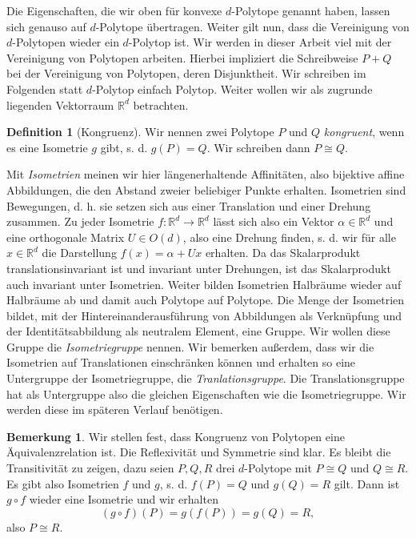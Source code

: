 \documentclass[11pt,titlepage]{article}
\newcommand{\setR}{\mathbb{R}}
\theoremstyle{definition}
\newtheorem{definition}[theorem]{Definition}
\newtheorem{remark}[theorem]{Bemerkung}
\theoremstyle{remark}
\begin{document}
	Die Eigenschaften, die wir oben für konvexe $d$-Polytope genannt haben, 
	lassen sich genauso auf $d$-Polytope übertragen. Weiter gilt nun, dass 
	die Vereinigung von $d$-Polytopen wieder ein $d$-Polytop ist. 
	Wir werden in dieser Arbeit viel mit der Vereinigung von Polytopen arbeiten. 
	Hierbei impliziert die Schreibweise $P+Q$ bei der Vereinigung von Polytopen, 
	deren Disjunktheit. Wir schreiben im Folgenden statt $d$-Polytop einfach Polytop. Weiter wollen wir als zugrunde liegenden Vektorraum $\setR^d$ 
	betrachten.
	
	\begin{definition}[Kongruenz] \label{def:kong}
		Wir nennen zwei Polytope $P$ und $Q$ \textsl{kongruent}, wenn es eine Isometrie $g$ gibt, s. d. 
		$g(P)=Q$. Wir schreiben dann $P\cong Q$.
	\end{definition}
	
	 Mit \textsl{Isometrien} meinen wir hier längenerhaltende Affinitäten, 
	 also bijektive affine Abbildungen, die den Abstand zweier beliebiger Punkte erhalten. 
	 Isometrien sind Bewegungen, d. h. sie setzen sich 
	 aus einer Translation und einer Drehung zusammen. Zu jeder 
	 Isometrie $f:\setR^d\to\setR^d$ lässt sich also ein Vektor 
	 $\alpha\in\setR^d$ und eine orthogonale Matrix $U\in O(d)$, also 
	 eine Drehung finden, s. d. wir für alle $x\in \setR^d$ 
	 die Darstellung $f(x)=\alpha + Ux$ erhalten. 
	 Da das Skalarprodukt translationsinvariant ist und 
	 invariant unter Drehungen, ist das Skalarprodukt auch invariant 
	 unter Isometrien. Weiter bilden Isometrien Halbräume wieder auf 
	 Halbräume ab und damit auch Polytope auf Polytope. Die Menge 
	 der Isometrien bildet, mit der Hintereinanderausführung von Abbildungen als 
	 Verknüpfung und der Identitätsabbildung als neutralem Element, eine Gruppe. 
	 Wir wollen 
	 diese Gruppe die \textsl{Isometriegruppe} nennen. Wir bemerken außerdem, dass 
	 wir die Isometrien auf Translationen einschränken können und erhalten 
	 so eine Untergruppe der Isometriegruppe, die \textsl{Tranlationsgruppe}. Die 
	 Translationsgruppe hat als Untergruppe also die gleichen Eigenschaften wie die 
	 Isometriegruppe. Wir werden diese im späteren Verlauf benötigen.

	\begin{remark}
		Wir stellen fest, dass Kongruenz von Polytopen eine Äquivalenzrelation ist. 
		Die Reflexivität und Symmetrie sind klar. Es bleibt die Transitivität 
		zu zeigen, dazu seien 
		$P,Q,R$ drei $d$-Polytope mit $P\cong Q$ und $Q\cong R$. Es gibt also 
		Isometrien $f$ und $g$, s. d. $f(P)=Q$ und $g(Q)=R$ gilt. Dann ist $g\circ f$ 
		wieder eine Isometrie und wir erhalten 
		\[(g\circ f)(P)=g(f(P))=g(Q)=R,\]
		also $P\cong R$. 
	\end{remark}
	
\end{document}
